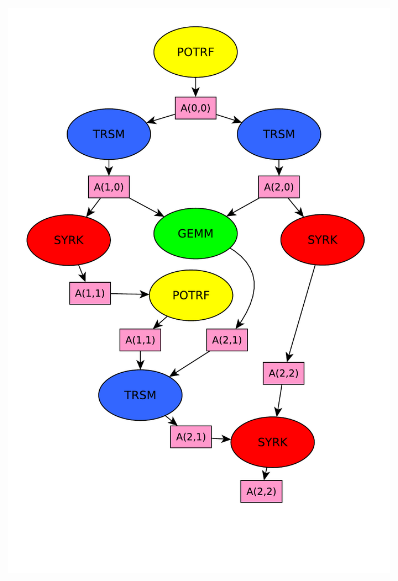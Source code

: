 \documentclass[xcolor={usenames,dvipsnames,svgnames,table}, aspectratio=43]{beamer}
\begin{document}
\begin{frame}[fragile]
\begin{minipage}[t]{0.46\linewidth}
\begin{figure}
{    \includegraphics[width=0.9\textwidth]{graph/anim-dag/anim-7.pdf}%
  }%
\end{figure}
\end{minipage}
\end{frame}
\end{document}
